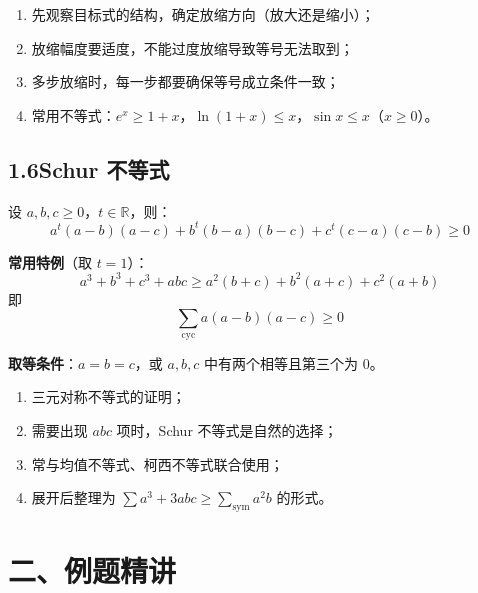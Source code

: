 \documentclass[12pt, a4paper]{ctexart}
\begin{document}
\begin{tipbox}[放缩法使用策略]
\begin{enumerate}[label=(\arabic*)]
  \item 先观察目标式的结构，确定放缩方向（放大还是缩小）；
  \item 放缩幅度要适度，不能过度放缩导致等号无法取到；
  \item 多步放缩时，每一步都要确保等号成立条件一致；
  \item 常用不等式：$e^x \geqslant 1+x$，$\ln(1+x) \leqslant x$，$\sin x \leqslant x$（$x \geqslant 0$）。
\end{enumerate}
\end{tipbox}

\subsection*{1.6\quad Schur 不等式}

\begin{knowledgebox}
设 $a,b,c \geqslant 0$，$t \in \mathbb{R}$，则：
\[
a^t(a-b)(a-c)+b^t(b-a)(b-c)+c^t(c-a)(c-b) \geqslant 0
\]

\medskip
\textbf{常用特例}（取 $t=1$）：
\[
a^3+b^3+c^3+abc \geqslant a^2(b+c)+b^2(a+c)+c^2(a+b)
\]
即
\[
\sum_{\text{cyc}} a(a-b)(a-c) \geqslant 0
\]

\medskip
\textbf{取等条件}：$a=b=c$，或 $a,b,c$ 中有两个相等且第三个为 $0$。
\end{knowledgebox}

\begin{tipbox}
\begin{enumerate}[label=(\arabic*)]
  \item 三元对称不等式的证明；
  \item 需要出现 $abc$ 项时，Schur 不等式是自然的选择；
  \item 常与均值不等式、柯西不等式联合使用；
  \item 展开后整理为 $\sum a^3+3abc \geqslant \sum_{\text{sym}} a^2b$ 的形式。
\end{enumerate}
\end{tipbox}

\newpage

\section*{\textcolor{examorange}{二、例题精讲}}
\end{document}
